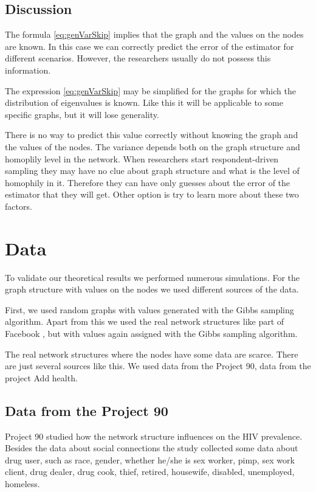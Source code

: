 \documentclass[12pt]{report}
\begin{document}
\subsection{Discussion}

The formula \ref{eq:genVarSkip} implies that the graph and the values on the nodes are known. In this case we can correctly predict the error of the estimator for different scenarios. However, the researchers usually do not possess this information.

The expression \ref{eq:genVarSkip} may be simplified for the graphs for which the distribution of eigenvalues is known. Like this it will be applicable to some specific graphs, but it will lose generality.

There is no way to predict this value correctly without knowing the graph and the values of the nodes. The variance depends both on the graph structure and homoplily level in the network. When researchers start respondent-driven sampling they may have no clue about graph structure and what is the level of homophily in it. Therefore they can have only guesses about the error of the estimator that they will get. Other option is try to learn more about these two factors.


\section{Data}

To validate our theoretical results we performed numerous simulations. For the graph structure with values on the nodes we used different sources of the data. 

First, we used random graphs with values generated with the Gibbs sampling algorithm. 
Apart from this we used the real network structures like part of Facebook \cite{Facebook}, but with values again assigned with the Gibbs sampling algorithm. 

The real network structures where the nodes have some data are scarce. There are just several sources like this. We used data from the Project 90\cite{Project90}, data from the project Add health\cite{Addhealth}. 

\subsection{Data from the Project 90}
Project 90 \cite{Project90} studied how the network structure influences on the HIV prevalence. Besides the data about social connections the study collected some data about drug user, such as race, gender, whether he/she is sex worker, pimp, sex work client, drug dealer, drug cook, thief, retired, housewife, disabled, unemployed, homeless.
\end{document}

